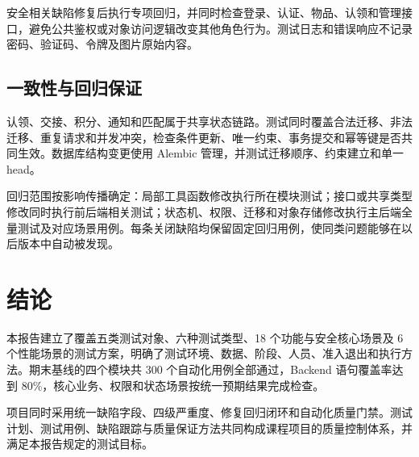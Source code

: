 安全相关缺陷修复后执行专项回归，并同时检查登录、认证、物品、认领和管理接口，避免公共鉴权或对象访问逻辑改变其他角色行为。测试日志和错误响应不记录密码、验证码、令牌及图片原始内容。

\subsection{一致性与回归保证}

认领、交接、积分、通知和匹配属于共享状态链路。测试同时覆盖合法迁移、非法迁移、重复请求和并发冲突，检查条件更新、唯一约束、事务提交和幂等键是否共同生效。数据库结构变更使用 Alembic 管理，并测试迁移顺序、约束建立和单一 head。

回归范围按影响传播确定：局部工具函数修改执行所在模块测试；接口或共享类型修改同时执行前后端相关测试；状态机、权限、迁移和对象存储修改执行主后端全量测试及对应场景用例。每条关闭缺陷均保留固定回归用例，使同类问题能够在以后版本中自动被发现。

\section{结论}

本报告建立了覆盖五类测试对象、六种测试类型、18 个功能与安全核心场景及 6 个性能场景的测试方案，明确了测试环境、数据、阶段、人员、准入退出和执行方法。期末基线的四个模块共 300 个自动化用例全部通过，Backend 语句覆盖率达到 80\%，核心业务、权限和状态场景按统一预期结果完成检查。

项目同时采用统一缺陷字段、四级严重度、修复回归闭环和自动化质量门禁。测试计划、测试用例、缺陷跟踪与质量保证方法共同构成课程项目的质量控制体系，并满足本报告规定的测试目标。

